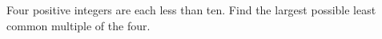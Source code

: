 Four positive integers are each less than ten. Find the largest possible least common multiple of the four.

